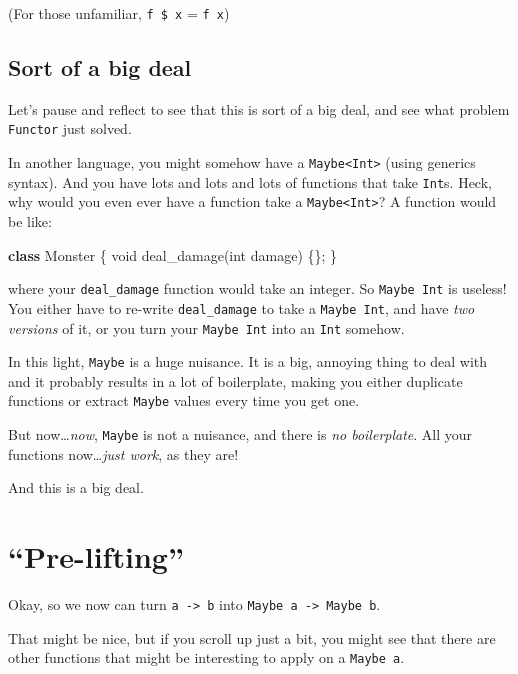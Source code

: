 \documentclass[]{article}
\newenvironment{Shaded}{}{}
\newcommand{\KeywordTok}[1]{\textcolor[rgb]{0.00,0.44,0.13}{\textbf{#1}}}
\newcommand{\DataTypeTok}[1]{\textcolor[rgb]{0.56,0.13,0.00}{#1}}
\newcommand{\FunctionTok}[1]{\textcolor[rgb]{0.02,0.16,0.49}{#1}}
\newcommand{\NormalTok}[1]{#1}
\begin{document}
(For those unfamiliar, \texttt{f\ \$\ x} = \texttt{f\ x})

\subsection{Sort of a big deal}\label{sort-of-a-big-deal}

Let's pause and reflect to see that this is sort of a big deal, and see what
problem \texttt{Functor} just solved.

In another language, you might somehow have a
\texttt{Maybe\textless{}Int\textgreater{}} (using generics syntax). And you have
lots and lots and lots of functions that take \texttt{Int}s. Heck, why would you
even ever have a function take a \texttt{Maybe\textless{}Int\textgreater{}}? A
function would be like:

\begin{Shaded}
\begin{Highlighting}[]
\KeywordTok{class}\NormalTok{ Monster \{}
    \DataTypeTok{void} \FunctionTok{deal_damage}\NormalTok{(}\DataTypeTok{int}\NormalTok{ damage) \{\};}
\NormalTok{\}}
\end{Highlighting}
\end{Shaded}

where your \texttt{deal\_damage} function would take an integer. So
\texttt{Maybe\ Int} is useless! You either have to re-write
\texttt{deal\_damage} to take a \texttt{Maybe\ Int}, and have \emph{two
versions} of it, or you turn your \texttt{Maybe\ Int} into an \texttt{Int}
somehow.

In this light, \texttt{Maybe} is a huge nuisance. It is a big, annoying thing to
deal with and it probably results in a lot of boilerplate, making you either
duplicate functions or extract \texttt{Maybe} values every time you get one.

But now\ldots{}\emph{now}, \texttt{Maybe} is not a nuisance, and there is
\emph{no boilerplate}. All your functions now\ldots{}\emph{just work}, as they
are!

And this is a big deal.

\section{\texorpdfstring{``Pre-lifting''}{Pre-lifting}}\label{pre-lifting}

Okay, so we now can turn \texttt{a\ -\textgreater{}\ b} into
\texttt{Maybe\ a\ -\textgreater{}\ Maybe\ b}.

That might be nice, but if you scroll up just a bit, you might see that there
are other functions that might be interesting to apply on a \texttt{Maybe\ a}.
\end{document}

